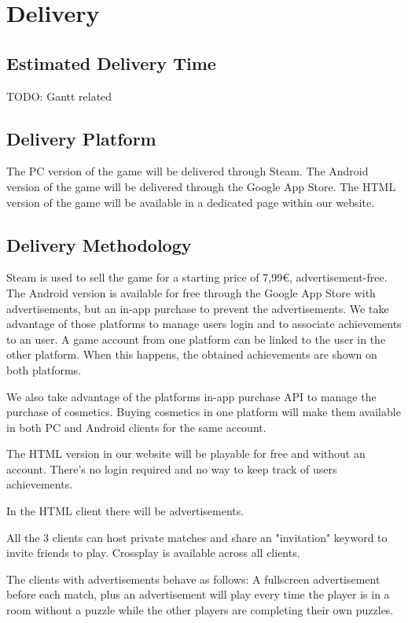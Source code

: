 \section{Delivery}
\subsection{Estimated Delivery Time}
TODO: Gantt related

\subsection{Delivery Platform}
The PC      version of the game will be delivered through Steam. 
The Android version of the game will be delivered through the Google App Store.
The HTML    version of the game will be available in a dedicated page within our website.

\subsection{Delivery Methodology}
Steam is used to sell the game for a starting price of 7,99€, advertisement-free.
The Android version is available for free through the Google App Store with advertisements, but an in-app purchase to prevent the advertisements.
We take advantage of those platforms to manage users login and to associate achievements to an user. A game account from one platform can be linked to the user in the other platform. When this happens, the obtained achievements are shown on both platforms. 


We also take advantage of the platforms in-app purchase API to manage the purchase of cosmetics. Buying cosmetics in one platform will make them available in both PC and Android clients for the same account.

The HTML version in our website will be playable for free and without an account. 
There's no login required and no way to keep track of users achievements.

In the HTML client there will be advertisements.

All the 3 clients can host private matches and share an "invitation" keyword to invite friends to play. Crossplay is available across all clients.

The clients with advertisements behave as follows:
A fullscreen advertisement before each match, plus an advertisement will play every time the player is in a room without a puzzle while the other players are completing their own puzzles.

\pagebreak 